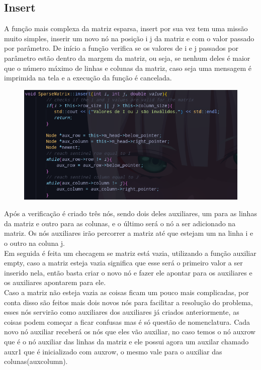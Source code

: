 \documentclass[a4paper,12pt]{article}
\begin{document}
\subsection{Insert}
A função mais complexa da matriz esparsa, insert por sua vez tem uma missão muito simples, inserir um novo nó na posição i j da matriz e com o valor passado por parâmetro.
De início a função verifica se os valores de i e j passados por parâmetro estão dentro da margem da matriz, ou seja, se nenhum deles é maior que o número máximo de linhas e colunas da matriz, caso seja uma mensagem é imprimida na tela e a execução da função é cancelada.

\begin{figure}[H]
\centering
\includegraphics[width=1\textwidth]{Imagens/sparsematrixCPP/sparsematrix-insert-pt1.png}
\caption{\label{fig:insert} }
\end{figure}

Após a verificação é criado três nós, sendo dois deles auxiliares, um para as linhas da matriz e outro para as colunas, e o último será o nó a ser adicionado na matriz.
Os nós auxiliares irão percorrer a matriz até que estejam um na linha i e o outro na coluna j.\\
Em seguida é feita um checagem se matriz está vazia, utilizando a função auxiliar empty, caso a matriz esteja vazia significa que esse será o primeiro valor a ser inserido nela, então basta criar o novo nó e fazer ele apontar para os auxiliares e os auxiliares apontarem para ele.\\
Caso a matriz não esteja vazia as coisas ficam um pouco mais complicadas, por conta disso são feitos mais dois novos nós para facilitar a resolução do problema, esses nós servirão como auxiliares dos auxiliares já criados anteriormente, as coisas podem começar a ficar confusas mas é só questão de nomenclatura. Cada novo nó auxiliar receberá os nós que eles vão auxiliar, no caso temos o nó auxrow que é o nó auxiliar das linhas da matriz e ele possui agora um auxilar chamado auxr1 que é inicializado com auxrow, o mesmo vale para o auxiliar das colunas(auxcolumn).
\end{document}
